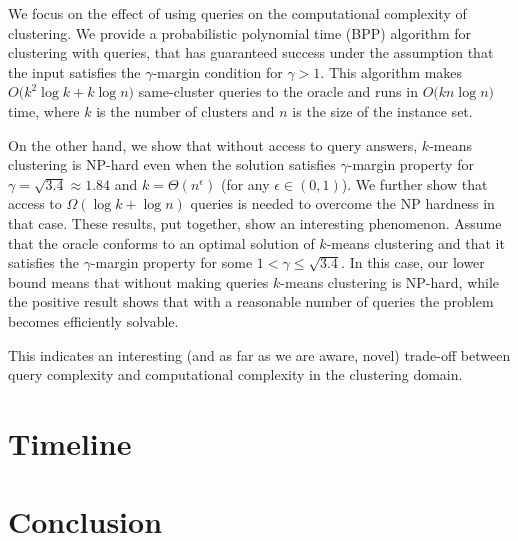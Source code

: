 \documentclass[11pt]{article}
\begin{document}
We focus on the effect of using queries on the computational complexity of clustering. We provide a probabilistic polynomial time (BPP) algorithm for clustering with queries, that has guaranteed success under the assumption that the input satisfies the $\gamma$-margin condition for $\gamma > 1$. This algorithm makes $O\big(k^2\log k + k\log n)$ same-cluster queries to the oracle and runs in $O\big(kn\log n)$ time, where $k$ is the number of clusters and $n$ is the size of the instance set.

On the other hand, we show that without access to query answers, $k$-means clustering is NP-hard even when the solution satisfies $\gamma$-margin property for $\gamma=\sqrt{3.4} \approx 1.84$ and $k=\Theta(n^\epsilon)$ (for any $\epsilon\in (0,1)$). We further show that access to $\Omega(\log k + \log n)$ queries is needed to overcome the NP hardness in that case.
These results, put together, show an interesting phenomenon. Assume that the oracle conforms to an optimal solution of $k$-means clustering and that it satisfies the $\gamma$-margin property for some $1<\gamma \leq \sqrt{3.4}$. In this case, our lower bound means that without making queries $k$-means clustering is NP-hard, while the positive result shows that with a reasonable number of queries the problem becomes efficiently solvable.  

This indicates an interesting (and as far as we are aware, novel) trade-off between query complexity and computational complexity in the clustering domain. 


\section{Timeline}
\label{section:timeline}

\section{Conclusion}
\end{document}
